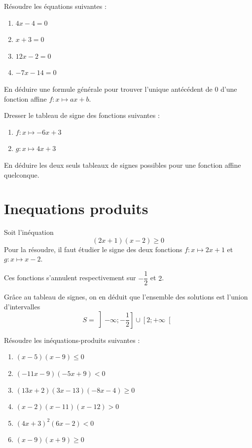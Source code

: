 \documentclass{exam}
\begin{document}
\begin{exercize}
Résoudre les équations suivantes :
\begin{enumerate}[label=\emph{\alph*)}]
\item $4x - 4 = 0$
\item $x + 3 = 0$
\item $12x - 2= 0$
\item $-7x - 14 = 0$ 
\end{enumerate}
En déduire une formule générale pour trouver l'unique antécédent de $0$ d'une fonction affine $f \colon x \mapsto ax + b$.
\end{exercize}
\newpage
\begin{exercize}
Dresser le tableau de signe des fonctions suivantes :
\begin{enumerate}[label=\emph{\alph*)}]
\item $f \colon x \mapsto -6x+3$
\item $g \colon x \mapsto 4x+3$
\end{enumerate}
En déduire les deux seuls tableaux de signes possibles pour une fonction affine quelconque.
\end{exercize}
\makeemptybox{5cm}
\section{Inequations produits}
\begin{example}
Soit l'inéquation
\begin{equation*}
(2x + 1)(x - 2) \geq 0
\end{equation*}
Pour la résoudre, il faut étudier le signe des deux fonctions $f \colon x \mapsto 2x + 1$ et $g \colon x \mapsto x - 2$.

Ces fonctions s'annulent respectivement sur $-\dfrac{1}{2}$ et $2$.

\begin{center}
\end{center}
Grâce au tableau de signes, on en déduit que l'ensemble des solutions est l'union d'intervalles 
\begin{equation*}
S = \left]-\infty;-\dfrac{1}{2}\right] \cup \left[2;+\infty\right[
\end{equation*}
\end{example}
\begin{exercize}
Résoudre les inéquations-produits suivantes :
\begin{enumerate}[label=\emph{\alph*)}]
\item $(x-5)(x-9)\leqslant0$
\item $(-11x-9)(-5x+9)<0$
\item $(13x+2)(3x-13)(-8x-4)\geqslant0$
\item $(x-2)(x-11)(x-12)>0$
\item $(4x+3)^2(6x-2)<0$
\item $(x-9)(x+9)\geqslant0$ 
\end{enumerate}    
\end{exercize}
\end{document}
